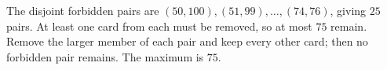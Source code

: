 The disjoint forbidden pairs are $(50,100),(51,99),\ldots,(74,76)$, giving $25$ pairs. At least one card from each must be removed, so at most $75$ remain. Remove the larger member of each pair and keep every other card; then no forbidden pair remains. The maximum is $\boxed{75}$.
